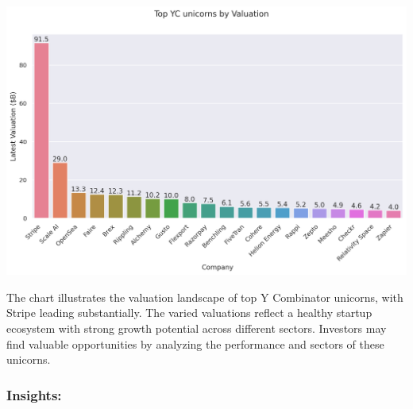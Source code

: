\documentclass[a4paper,12pt]{article}
\begin{document}
\begin{center}
\includegraphics[width=.9\linewidth]{./.ob-jupyter/e02697237892223cfaca11a3e1141f825906d920.png}
\label{}
\end{center}

The chart illustrates the valuation landscape of top Y Combinator unicorns, with Stripe leading substantially. The varied valuations reflect a healthy startup ecosystem with strong growth potential across different sectors. Investors may find valuable opportunities by analyzing the performance and sectors of these unicorns.

\subsubsection*{Insights:}
\end{document}

